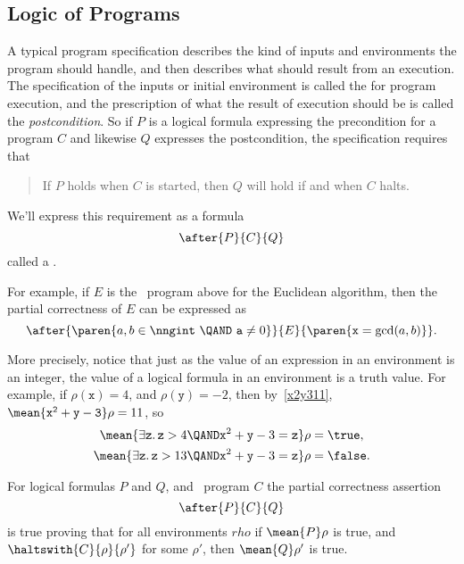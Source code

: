 \begin{problems}
\homeworkproblems
{}
\end{problems}

\subsection{Logic of Programs}

A typical program specification describes the kind of inputs and
environments the program should handle, and then describes what should
result from an execution.  The specification of the inputs or initial
environment is called the  for program execution, and
the prescription of what the result of execution should be is called the
\emph{postcondition}.  So if $P$ is a logical formula expressing the precondition
for a program $C$ and likewise $Q$ expresses the postcondition, the
specification requires that
\begin{quote}
If $P$ holds when $C$ is started, then $Q$ will hold if and when $C$ halts.
\end{quote}
We'll express this requirement as a formula
\[
\after{P}{C}{Q}
\]
called a .

For example, if $E$ is the \while\ program above for the Euclidean
algorithm, then the partial correctness of $E$ can be expressed as
\begin{equation}\label{eucpc}
\after{\paren{a, b \in \nngint\ \QAND\  \mathtt{a} \neq 0}}{E}
                   {\paren{\mathtt{x} = \gcd(a,b)}}.
\end{equation}

More precisely, notice that just as the value of an expression in an
environment is an integer, the value of a logical formula in an
environment is a truth value.  For example, if $\rho(\mathtt{x}) =4$,
and $\rho(\mathtt{y}) =-2$, then by~\eqref{x2y311},
$\mean{\mathtt{x^2+y -3}}\rho = 11$, so
\begin{align*}
\mean{\exists \mathtt{z}.\, \mathtt{z} > 4 \QAND \mathtt{x}^2+\mathtt{y} -3=\mathtt{z}}\rho & = \true,\\
\mean{\exists \mathtt{z}.\, \mathtt{z} > 13 \QAND \mathtt{x}^2+\mathtt{y} -3=\mathtt{z}}\rho & = \false.
\end{align*}

\begin{definition}\label{def_afterPCQ}
For logical formulas $P$ and $Q$, and \while\ program $C$ the partial correctness assertion
\[
\after{P}{C}{Q}
\]
is true proving that for all environments $rho$ if $\mean{P}\rho$ is
true, and $\haltswith{C}{\rho}{\rho'}$ for some $\rho'$, then
$\mean{Q}\rho'$ is true.
\end{definition}

